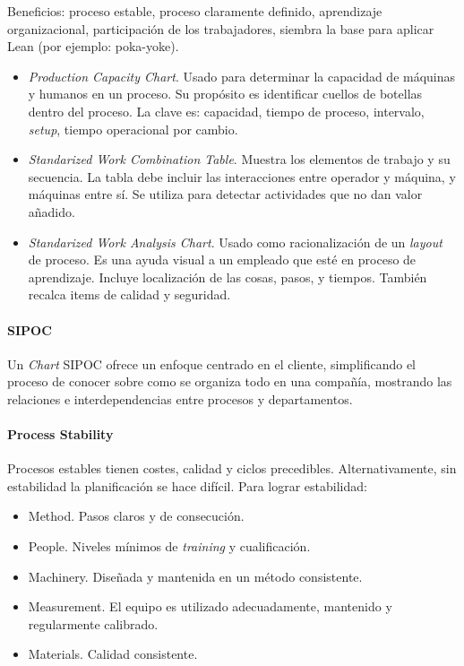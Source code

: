 \documentclass[oneside]{book}
\begin{document}
Beneficios: proceso estable, proceso claramente definido, aprendizaje organizacional, participación de los trabajadores, siembra la base para aplicar Lean (por ejemplo: poka-yoke).

\begin{itemize}
	\item \textit{Production Capacity Chart}. Usado para determinar la capacidad de máquinas y humanos en un proceso. Su propósito es identificar cuellos de botellas dentro del proceso. La clave es: capacidad, tiempo de proceso, intervalo, \textit{setup}, tiempo operacional por cambio.
	\item \textit{Standarized Work Combination Table}. Muestra los elementos de trabajo y su secuencia. La tabla debe incluir las interacciones entre operador y máquina, y máquinas entre sí. Se utiliza para detectar actividades que no dan valor añadido.
	\item \textit{Standarized Work Analysis Chart}. Usado como racionalización de un \textit{layout} de proceso. Es una ayuda visual a un empleado que esté en proceso de aprendizaje. Incluye localización de las cosas, pasos, y tiempos. También recalca items de calidad y seguridad.
\end{itemize}

\paragraph{SIPOC}

Un \textit{Chart} SIPOC ofrece un enfoque centrado en el cliente, simplificando el proceso de conocer sobre como se organiza todo en una compañía, mostrando las relaciones e interdependencias entre procesos y departamentos.

\paragraph{Process Stability}
Procesos estables tienen costes, calidad y ciclos precedibles. Alternativamente, sin estabilidad la planificación se hace difícil. Para lograr estabilidad:
\begin{itemize}
	\item Method. Pasos claros y de consecución.
	\item People. Niveles mínimos de \textit{training} y cualificación.
	\item Machinery. Diseñada y mantenida en un método consistente.
	\item Measurement. El equipo es utilizado adecuadamente, mantenido y regularmente calibrado.
	\item Materials. Calidad consistente.
\end{itemize}
\end{document}
